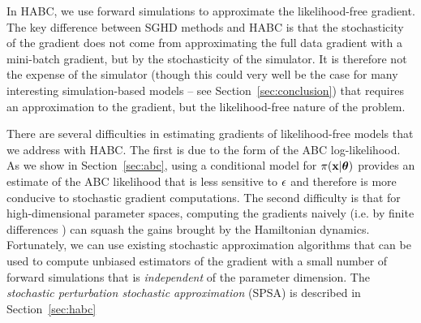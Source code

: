\documentclass[]{article}
\begin{document}
In HABC, we use forward simulations to approximate the likelihood-free gradient. The key difference between SGHD methods and HABC is that the stochasticity of the gradient does not come from approximating the full data gradient with a mini-batch gradient, but by the stochasticity of the simulator.  It is therefore not the expense of the simulator (though this could very well be the case for many interesting simulation-based models -- see Section~\ref{sec:conclusion}) that requires an approximation to the gradient, but the likelihood-free nature of the problem.  

There are several difficulties in estimating gradients of likelihood-free models that we address with HABC.  The first is due to the form of the ABC log-likelihood.  As we show in Section~\ref{sec:abc}, using a conditional model for $\pi( {\bf x} | {\bm \theta} )$ provides an estimate of the ABC likelihood that is less sensitive to $\epsilon$ and therefore is more conducive to stochastic gradient computations.  The second difficulty is that for high-dimensional parameter spaces, computing the gradients naively (i.e. by finite differences \cite{kiefer1952stochastic}) can squash the gains brought by the Hamiltonian dynamics.  Fortunately, we can use existing stochastic approximation algorithms \cite{spall1992multivariate,spall2000adaptive} that can be used to compute unbiased estimators of the gradient with a small number of forward simulations that is {\em independent} of the parameter dimension.  The {\em stochastic perturbation stochastic approximation} (SPSA) \cite{spall1992multivariate} is described in Section~\ref{sec:habc}




\end{document}
